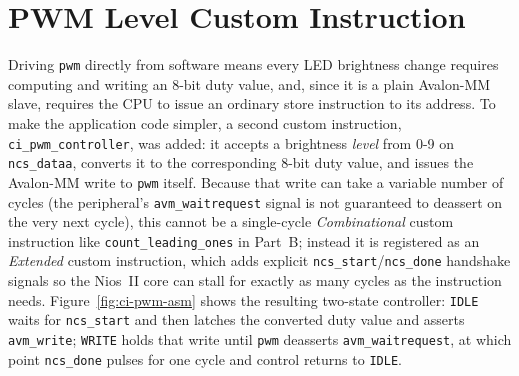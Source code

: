 \documentclass[
    12pt,
    a4paper
]{report}
\begin{document}
\section{PWM Level Custom Instruction}

Driving \texttt{pwm} directly from software means every LED brightness change requires computing
and writing an 8-bit duty value, and, since it is a plain Avalon-MM slave, requires the CPU to
issue an ordinary store instruction to its address. To make the application code simpler, a second
custom instruction, \texttt{ci\_pwm\_controller}, was added: it accepts a brightness \emph{level}
from 0-9 on \texttt{ncs\_dataa}, converts it to the corresponding 8-bit duty value, and issues the
Avalon-MM write to \texttt{pwm} itself. Because that write can take a variable number of cycles
(the peripheral's \texttt{avm\_waitrequest} signal is not guaranteed to deassert on the very next
cycle), this cannot be a single-cycle \emph{Combinational} custom instruction like
\texttt{count\_leading\_ones} in Part~B; instead it is registered as an \emph{Extended} custom
instruction, which adds explicit \texttt{ncs\_start}/\texttt{ncs\_done} handshake signals so the
Nios~II core can stall for exactly as many cycles as the instruction needs. Figure~\ref{fig:ci-pwm-asm}
shows the resulting two-state controller: \texttt{IDLE} waits for \texttt{ncs\_start} and then
latches the converted duty value and asserts \texttt{avm\_write}; \texttt{WRITE} holds that write
until \texttt{pwm} deasserts \texttt{avm\_waitrequest}, at which point \texttt{ncs\_done} pulses for
one cycle and control returns to \texttt{IDLE}.
\end{document}
